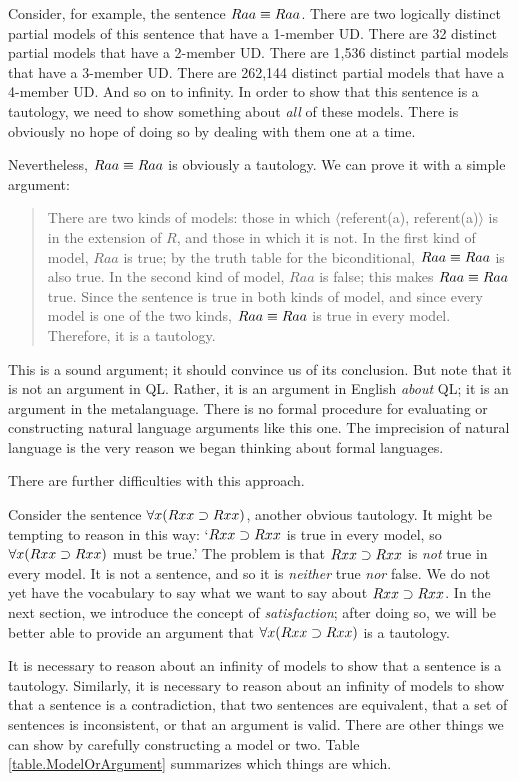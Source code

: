Consider, for example, the sentence $Raa\equiv Raa$. There are two logically distinct partial models of this sentence that have a 1-member UD. There are 32 distinct partial models that have a 2-member UD. There are 1,536 distinct partial models that have a 3-member UD. There are 262,144 distinct partial models that have a 4-member UD. And so on to infinity. In order to show that this sentence is a tautology, we need to show something about \emph{all} of these models. There is obviously no hope of doing so by dealing with them one at a time.

Nevertheless, $Raa\equiv Raa$ is obviously a tautology. We can prove it with a simple argument:
\begin{quote}
\label{allmodels1}
There are two kinds of models: those in which $\langle$referent(a), referent(a)$\rangle$ is in the extension of $R$, and those in which it is not. In the first kind of model, $Raa$ is true; by the truth table for the biconditional, $Raa\equiv Raa$ is also true. In the second kind of model, $Raa$ is false; this makes $Raa\equiv Raa$ true. Since the sentence is true in both kinds of model, and since every model is one of the two kinds, $Raa\equiv Raa$ is true in every model. Therefore, it is a tautology.
\end{quote}
This is a sound argument; it should convince us of its conclusion. But note that it is not an argument in QL. Rather, it is an argument in English \emph{about} QL; it is an argument in the metalanguage. There is no formal procedure for evaluating or constructing natural language arguments like this one. The imprecision of natural language is the very reason we began thinking about formal languages.

There are further difficulties with this approach.

Consider the sentence $\forall x(Rxx\supset Rxx)$, another obvious tautology. It might be tempting to reason in this way: `$Rxx\supset Rxx$ is true in every model, so $\forall x(Rxx\supset Rxx)$ must be true.' The problem is that $Rxx\supset Rxx$ is \emph{not} true in every model. It is not a sentence, and so it is \emph{neither} true \emph{nor} false. We do not yet have the vocabulary to say what we want to say about $Rxx\supset Rxx$. In the next section, we introduce the concept of \emph{satisfaction}; after doing so, we will be better able to provide an argument that $\forall x(Rxx\supset Rxx)$ is a tautology.

It is necessary to reason about an infinity of models to show that a sentence is a tautology. Similarly, it is necessary to reason about an infinity of models to show that a sentence is a contradiction, that two sentences are equivalent, that a set of sentences is inconsistent, or that an argument is valid. There are other things we can show by carefully constructing a model or two. Table \ref{table.ModelOrArgument} summarizes which things are which.






